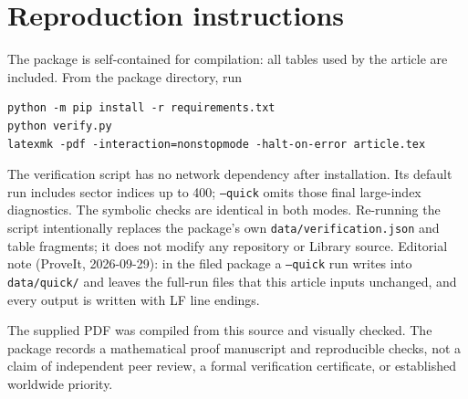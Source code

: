 \documentclass[11pt,a4paper]{article}
\theoremstyle{definition}
\theoremstyle{remark}
\begin{document}
\section{Reproduction instructions}
\label{app:reproduction}
The package is self-contained for compilation: all tables used by the
article are included. From the package directory, run
\begin{verbatim}
python -m pip install -r requirements.txt
python verify.py
latexmk -pdf -interaction=nonstopmode -halt-on-error article.tex
\end{verbatim}
The verification script has no network dependency after installation.
Its default run includes sector indices up to 400; \texttt{--quick}
omits those final large-index diagnostics. The symbolic checks are
identical in both modes. Re-running the script intentionally replaces
the package's own \texttt{data/verification.json} and table fragments;
it does not modify any repository or Library source.
Editorial note (ProveIt, 2026-09-29): in the filed package a
\texttt{--quick} run writes into \texttt{data/quick/} and leaves the
full-run files that this article inputs unchanged, and every output is
written with LF line endings.

The supplied PDF was compiled from this source and visually checked.
The package records a mathematical proof manuscript and reproducible
checks, not a claim of independent peer review, a formal verification
certificate, or established worldwide priority.
\end{document}
